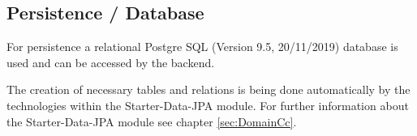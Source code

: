 \subsection{Persistence / Database}
\label{sec:DomainCd}

For persistence a relational Postgre \acs{SQL} (Version 9.5, 20/11/2019) database is used and can be accessed by the backend. 

The creation of necessary tables and relations is being done automatically by the technologies within the Starter-Data-\ac{JPA} module. For further information about the Starter-Data-\ac{JPA} module see chapter \ref{sec:DomainCc}.

